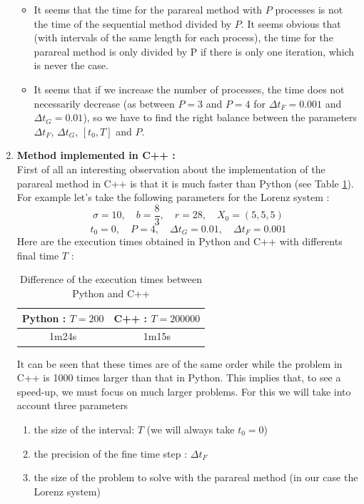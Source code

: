 \begin{enumerate}[label=\textbullet]
\begin{itemize}[label=-]
		\item It seems that the time for the parareal method with $P$ processes is not the time of the sequential method divided by $P$. It seems obvious that (with intervals of the same length for each process), the time for the parareal method is only divided by P if there is only one iteration, which is never the case.
		\item It seems that if we increase the number of processes, the time does not necessarily decrease (as between $P=3$ and $P=4$ for $\Delta t_F=0.001$ and $\Delta t_G=0.01$), so we have to find the right balance between the parameters $\Delta t_F$, $\Delta t_G$, $[t_0,T]$ and $P$.
	\end{itemize}
	\item \textbf{Method implemented in C++ :} \\
	First of all an interesting observation about the implementation of the parareal method in C++ is that it is much faster than Python (see Table \ref{cpp_faster}). \\
	For example let's take the following parameters for the Lorenz system :
	$$\sigma=10, \quad b=\frac{8}{3}, \quad r=28, \quad X_0=(5,5,5)$$
	$$t_0=0, \quad P=4,\quad \Delta t_G=0.01, \quad \Delta t_F=0.001$$
	Here are the execution times obtained in Python and C++ with differents final time $T$ :
	\begin{table}[H]
		\centering
		\begin{tabular}{| c | c |}
			\hline
			Python : $T=200$ & C++ : $T=200000$ \\
			\hline 
			1m24s & 1m15s \\
			\hline
		\end{tabular}
		\caption{Difference of the execution times between Python and C++}
		\label{cpp_faster}
	\end{table}
	It can be seen that these times are of the same order while the problem in C++ is 1000 times larger than that in Python. This implies that, to see a speed-up, we must focus on much larger problems. For this we will take into account three parameters
	\begin{enumerate}[label=\textbullet]
		\item the size of the interval: $T$ (we will always take $t_0=0$)
		\item the precision of the fine time step : $\Delta t_F$
		\item the size of the problem to solve with the parareal method (in our case the Lorenz system)
	\end{enumerate}

\end{enumerate}
